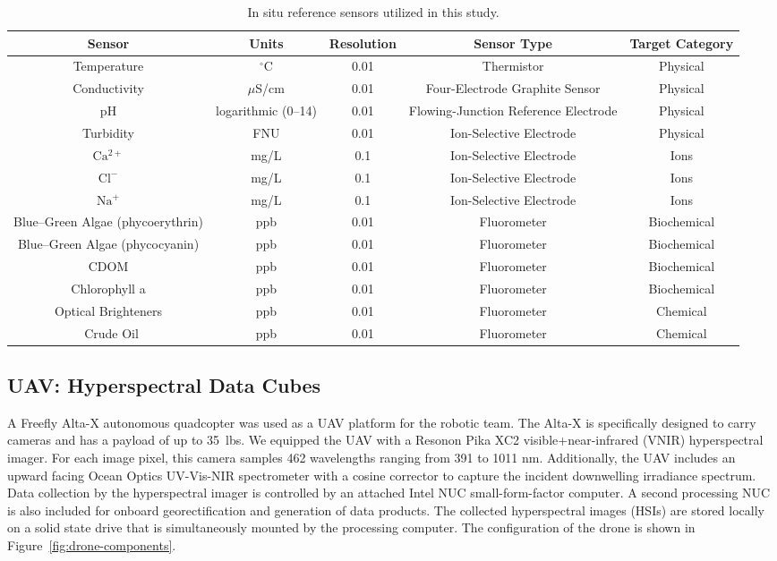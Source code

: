 \begin{sidewaystable}
  \caption{In situ reference sensors utilized in this study.}
  \label{tab:sensors}
  \begin{center}
    \begin{tabular}{ccccc} \hline
      \textbf{Sensor}	& \textbf{Units} & \textbf{Resolution} & \textbf{Sensor Type} & \textbf{Target Category}\\ \hline
      Temperature & $^{\circ}$C & 0.01 & Thermistor & Physical \\
      Conductivity & $\mu$S/cm & 0.01 & Four-Electrode Graphite Sensor & Physical  \\
      pH & logarithmic (0--14) & 0.01 & Flowing-Junction Reference Electrode & Physical \\
      Turbidity & FNU & 0.01 & Ion-Selective Electrode & Physical \\
      $\mathrm{Ca^{2+}}$ & mg/L & 0.1 & Ion-Selective Electrode & Ions \\
      $\mathrm{Cl^-}$ & mg/L & 0.1 & Ion-Selective Electrode & Ions \\
      $\mathrm{Na^+}$ & mg/L & 0.1 & Ion-Selective Electrode & Ions \\
      Blue--Green Algae (phycoerythrin) & ppb & 0.01 & Fluorometer & Biochemical \\
      Blue--Green Algae (phycocyanin) & ppb & 0.01  & Fluorometer & Biochemical \\
      CDOM & ppb & 0.01 & Fluorometer & Biochemical \\
      Chlorophyll a & ppb & 0.01 & Fluorometer & Biochemical \\
      Optical Brighteners & ppb & 0.01 & Fluorometer & Chemical \\\
      Crude Oil & ppb & 0.01 & Fluorometer & Chemical
    \end{tabular}
  \end{center}
\end{sidewaystable}

\clearpage
\newpage

\subsection{UAV: Hyperspectral Data Cubes}

A Freefly Alta-X autonomous quadcopter was used as a UAV platform for the robotic team. The Alta-X is specifically designed to carry cameras and has a payload of up to 35~lbs. We equipped the UAV with a Resonon Pika XC2 visible+near-infrared (VNIR) hyperspectral imager. For each image pixel, this camera samples 462 wavelengths ranging from 391 to 1011 nm.  Additionally, the UAV includes an upward facing Ocean Optics UV-Vis-NIR spectrometer with a cosine corrector to capture the incident downwelling irradiance spectrum. Data collection by the hyperspectral imager is controlled by an attached Intel NUC small-form-factor computer. A second processing NUC is also included for onboard georectification and generation of data products. The collected hyperspectral images (HSIs) are stored locally on a solid state drive that is simultaneously mounted by the processing computer. The configuration of the drone is shown in Figure~\ref{fig:drone-components}.

